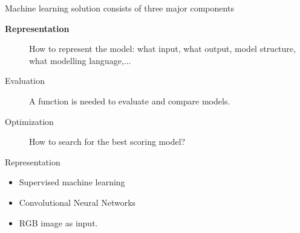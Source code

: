 \documentclass{beamer}
\begin{document}
\begin{frame}
 {\large Machine learning solution consists of three major components}
\begin{description}
 \item[\textbf{Representation}] How to represent the model: what input, what output, model structure, what modelling language,...
 \item[Evaluation] A function is needed to evaluate and compare models. 
 \item[Optimization] How to search for the best scoring model?
\end{description}
\end{frame}


\begin{frame}{Representation}
\begin{itemize}
 \item Supervised machine learning
 \item Convolutional Neural Networks
 \item RGB image as input. 
\end{itemize}
\end{frame}
\end{document}
